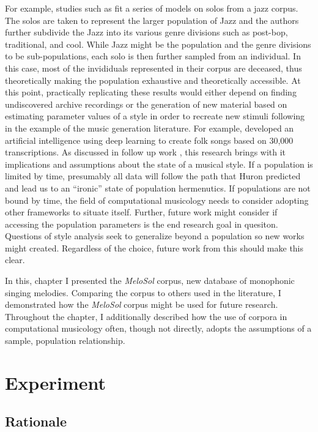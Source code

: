 \documentclass[12pt,]{book}
\begin{document}
For example, studies such as \citet{frielerTellingStoryDramaturgy2016} fit a series of models on solos from a jazz corpus.
The solos are taken to represent the larger population of Jazz and the authors further subdivide the Jazz into its various genre divisions such as post-bop, traditional, and cool.
While Jazz might be the population and the genre divisions to be sub-populations, each solo is then further sampled from an individual.
In this case, most of the invididuals represented in their corpus are deceased, thus theoretically making the population exhaustive and theoretically accessible.
At this point, practically replicating these results would either depend on finding undiscovered archive recordings or the generation of new material based on estimating parameter values of a style in order to recreate new stimuli following in the example of the music generation literature.
For example, \citet{sturmTakingModelsBack2017} developed an artificial intelligence using deep learning to create folk songs based on 30,000 transcriptions.
As discussed in follow up work \citep{sturmMachineLearningResearch2019}, this research brings with it implications and assumptions about the state of a musical style.
If a population is limited by time, presumably all data will follow the path that Huron predicted and lead us to an ``ironic'' state of population hermenutics.
If populations are not bound by time, the field of computational musicology needs to consider adopting other frameworks to situate itself.
Further, future work might consider if accessing the population parameters is the end research goal in quesiton.
Questions of style analysis seek to generalize beyond a population so new works might created.
Regardless of the choice, future work from this should make this clear.

In this, chapter I presented the \emph{MeloSol} corpus, new database of monophonic singing melodies.
Comparing the corpus to others used in the literature, I demonstrated how the \emph{MeloSol} corpus might be used for future research.
Throughout the chapter, I additionally described how the use of corpora in computational musicology often, though not directly, adopts the assumptions of a sample, population relationship.

\hypertarget{experiment}{%
\chapter{Experiment}\label{experiment}}

\hypertarget{rationale-4}{%
\section{Rationale}\label{rationale-4}}
\end{document}
